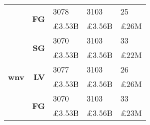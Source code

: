 \begin{table}[!htbp]
\begin{tabular}{r|r|>{\raggedleft\arraybackslash}p{3.5cm}|>{\raggedleft\arraybackslash}p{3.2cm}|>{\raggedleft\arraybackslash}p{3.5cm}}
& \multirow{2}{*}{\textbf{FG}}
& {3078} & {3103} & {25}\\
& {} & {\pounds3.53B} & {\pounds3.56B} & {\pounds26M}\\
\hline
\multirow{6}{*}{\textbf{wnv}}
& \multirow{2}{*}{\textbf{SG}}
& {3070} & {3103} & {33}\\
& {} & {\pounds3.53B} & {\pounds3.56B} & {\pounds22M}\\
\cline{2-5}
& \multirow{2}{*}{\textbf{LV}}
& {3077} & {3103} & {26}\\
& {} & {\pounds3.53B} & {\pounds3.56B} & {\pounds26M}\\
\cline{2-5}
& \multirow{2}{*}{\textbf{FG}}
& {3070} & {3103} & {33}\\
& {} & {\pounds3.53B} & {\pounds3.56B} & {\pounds23M}\\
\end{tabular}
\end{table}

\clearpage

